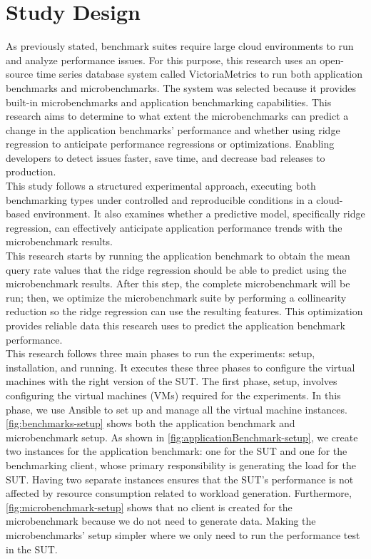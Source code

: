 \section{Study Design}
\label{cha:studydesign}
As previously stated, benchmark suites require large cloud environments to run and analyze performance issues. For this purpose, this research uses an open-source time series database system called VictoriaMetrics to run both application benchmarks and microbenchmarks. The system was selected because it provides built-in microbenchmarks and application benchmarking capabilities. This research aims to determine to what extent the microbenchmarks can predict a change in the application benchmarks’ performance and whether using ridge regression to anticipate performance regressions or optimizations. Enabling developers to detect issues faster, save time, and decrease bad releases to production.  \\
This study follows a structured experimental approach, executing both benchmarking types under controlled and reproducible conditions in a cloud-based environment. It also examines whether a predictive model, specifically ridge regression, can effectively anticipate application performance trends with the microbenchmark results. \\
This research starts by running the application benchmark to obtain the mean query rate values that the ridge regression should be able to predict using the microbenchmark results. After this step, the complete microbenchmark will be run; then, we optimize the microbenchmark suite by performing a collinearity reduction so the ridge regression can use the resulting features. This optimization provides reliable data this research uses to predict the application benchmark performance. \\
This research follows three main phases to run the experiments: setup, installation, and running. It executes these three phases to configure the virtual machines with the right version of the \ac{SUT}. The first phase, setup, involves configuring the virtual machines (\ac{VM}s) required for the experiments. In this phase, we use Ansible to set up and manage all the virtual machine instances.  \\
\cref{fig:benchmarks-setup} shows both the application benchmark and microbenchmark setup. As shown in \cref{fig:applicationBenchmark-setup}, we create two instances for the application benchmark: one for the \ac{SUT} and one for the benchmarking client, whose primary responsibility is generating the load for the \ac{SUT}. Having two separate instances ensures that the \ac{SUT}’s performance is not affected by resource consumption related to workload generation. Furthermore, \cref{fig:microbenchmark-setup} shows that no client is created for the microbenchmark because we do not need to generate data. Making the microbenchmarks’ setup simpler where we only need to run the performance test in the \ac{SUT}.

